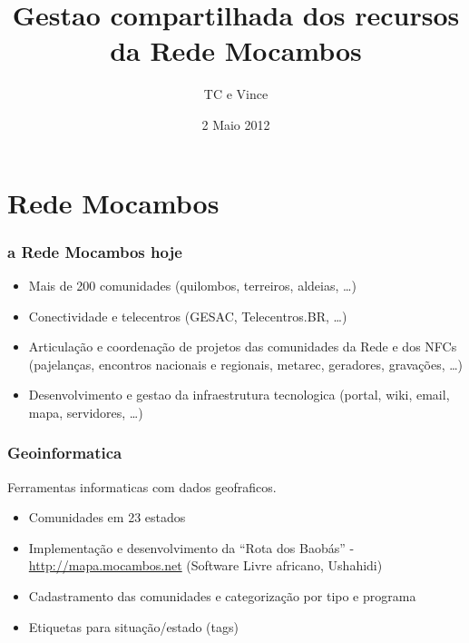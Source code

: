 \documentclass{beamer}
\title{Gestao compartilhada dos recursos da Rede Mocambos}
\author{TC e Vince}
\institute{Casa de Cultura Tain\~{a} - Rede Mocambos}
\date{2 Maio 2012}
\begin{document}
{
%
\begin{frame}
  \titlepage
\end{frame}


\section{Rede Mocambos}


\begin{frame}
  \frametitle{a Rede Mocambos hoje}

  \begin{itemize}
    \item Mais de 200 comunidades (quilombos, terreiros, aldeias, \ldots)
    \item Conectividade e telecentros (GESAC, Telecentros.BR, \ldots)
    \item Articulação e coordenação de projetos das comunidades da
      Rede e dos NFCs (pajelanças, encontros nacionais e regionais, metarec,
      geradores, gravações, \ldots)
    \item Desenvolvimento e gestao da infraestrutura tecnologica
      (portal, wiki, email, mapa, servidores, \ldots)  
    \end{itemize}
\end{frame}

\begin{frame}
  \frametitle{Geoinformatica}
  Ferramentas informaticas com dados geofraficos.
  \begin{itemize}
    \item Comunidades em 23 estados
    \item Implementação e desenvolvimento da ``Rota dos Baobás'' -
      \url{http://mapa.mocambos.net} (Software Livre africano, Ushahidi)
    \item Cadastramento das comunidades e categorização por tipo e programa
    \item Etiquetas para situação/estado (tags)
    \end{itemize}
\end{frame}

}
\end{document}
